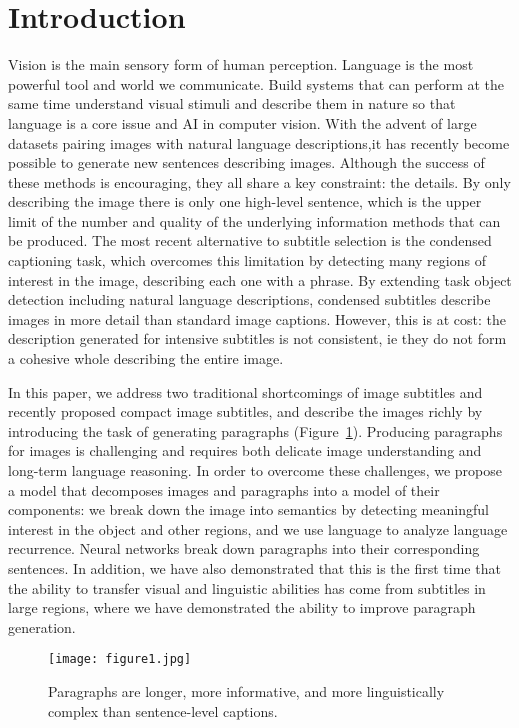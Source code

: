\documentclass[10pt,twocolumn,letterpaper]{article}
\begin{document}
\section{Introduction}
Vision is the main sensory form of human perception. Language is the most powerful tool and world we communicate. Build systems that can perform at the same time understand visual stimuli and describe them in nature so that language is a core issue and AI in computer vision. With the advent of large datasets pairing images with natural language descriptions,it has recently become possible to generate new sentences describing images\cite{Chen_2015_Mind}. Although the success of these methods is encouraging, they all share a key constraint: the details. By only describing the image there is only one high-level sentence, which is the upper limit of the number and quality of the underlying information methods that can be produced. The most recent alternative to subtitle selection is the condensed captioning task\cite{Johnson_2016_DenseCap}, which overcomes this limitation by detecting many regions of interest in the image, describing each one with a phrase. By extending task object detection including natural language descriptions, condensed subtitles describe images in more detail than standard image captions. However, this is at cost: the description generated for intensive subtitles is not consistent, ie they do not form a cohesive whole describing the entire image.
\par In this paper, we address two traditional shortcomings of image subtitles and recently proposed compact image subtitles, and describe the images richly by introducing the task of generating paragraphs (Figure~\ref{pic1}). Producing paragraphs for images is challenging and requires both delicate image understanding and long-term language reasoning. In order to overcome these challenges, we propose a model that decomposes images and paragraphs into a model of their components: we break down the image into semantics by detecting meaningful interest in the object and other regions, and we use language to analyze language recurrence. Neural networks break down paragraphs into their corresponding sentences. In addition, we have also demonstrated that this is the first time that the ability to transfer visual and linguistic abilities has come from subtitles in large regions, where we have demonstrated the ability to improve paragraph generation.
\begin{figure}
	\centering
	\texttt{[image: figure1.jpg]}
	\caption{ Paragraphs are longer, more informative, and more
		linguistically complex than sentence-level captions. }\label{pic1}
\end{figure}
\end{document}
